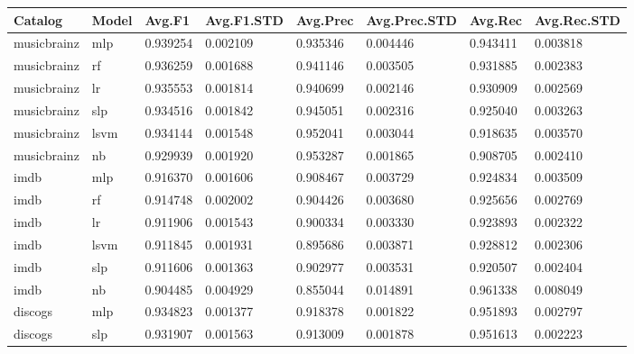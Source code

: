 \documentclass[epsfig,a4paper,11pt,titlepage,twoside,openany]{book}
\begin{document}
\begin{longtable}{|l|l|l|l|l|l|l|l|}
\hline
Catalog     & Model                             & Avg.F1 & Avg.F1.STD & Avg.Prec & Avg.Prec.STD & Avg.Rec & Avg.Rec.STD \\ \hline
musicbrainz & mlp          & 0.939254   & 0.002109       & 0.935346     & 0.004446         & 0.943411       & 0.003818           \\
musicbrainz & rf                    & 0.936259   & 0.001688       & 0.941146     & 0.003505         & 0.931885       & 0.002383           \\
musicbrainz & lr              & 0.935553   & 0.001814       & 0.940699     & 0.002146         & 0.930909       & 0.002569           \\
musicbrainz & slp         & 0.934516   & 0.001842       & 0.945051     & 0.002316         & 0.925040       & 0.003263           \\
musicbrainz & lsvm & 0.934144   & 0.001548       & 0.952041     & 0.003044         & 0.918635       & 0.003570           \\
musicbrainz & nb                      & 0.929939   & 0.001920       & 0.953287     & 0.001865         & 0.908705       & 0.002410           \\ \hline
imdb        & mlp          & 0.916370   & 0.001606       & 0.908467     & 0.003729         & 0.924834       & 0.003509           \\
imdb        & rf                    & 0.914748   & 0.002002       & 0.904426     & 0.003680         & 0.925656       & 0.002769           \\
imdb        & lr              & 0.911906   & 0.001543       & 0.900334     & 0.003330         & 0.923893       & 0.002322           \\
imdb        & lsvm & 0.911845   & 0.001931       & 0.895686     & 0.003871         & 0.928812       & 0.002306           \\
imdb        & slp         & 0.911606   & 0.001363       & 0.902977     & 0.003531         & 0.920507       & 0.002404           \\
imdb        & nb                      & 0.904485   & 0.004929       & 0.855044     & 0.014891         & 0.961338       & 0.008049           \\ \hline
discogs     & mlp          & 0.934823   & 0.001377       & 0.918378     & 0.001822         & 0.951893       & 0.002797           \\
discogs     & slp         & 0.931907   & 0.001563       & 0.913009     & 0.001878         & 0.951613       & 0.002223           \\

\end{longtable}
\end{document}
